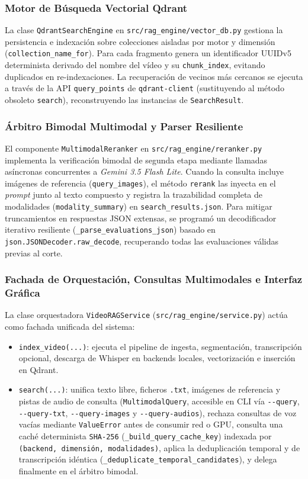 \subsubsection{Motor de Búsqueda Vectorial Qdrant}
La clase \texttt{QdrantSearchEngine} en \texttt{src/rag\_engine/vector\_db.py} gestiona la persistencia e indexación sobre colecciones aisladas por motor y dimensión (\texttt{collection\_name\_for}). Para cada fragmento genera un identificador UUIDv5 determinista derivado del nombre del vídeo y su \texttt{chunk\_index}, evitando duplicados en re-indexaciones. La recuperación de vecinos más cercanos se ejecuta a través de la API \texttt{query\_points} de \texttt{qdrant-client} (sustituyendo al método obsoleto \texttt{search}), reconstruyendo las instancias de \texttt{SearchResult}.

\subsubsection{Árbitro Bimodal Multimodal y Parser Resiliente}
El componente \texttt{MultimodalReranker} en \texttt{src/rag\_engine/reranker.py} implementa la verificación bimodal de segunda etapa mediante llamadas asíncronas concurrentes a \textit{Gemini 3.5 Flash Lite}. Cuando la consulta incluye imágenes de referencia (\texttt{query\_images}), el método \texttt{rerank} las inyecta en el \textit{prompt} junto al texto compuesto y registra la trazabilidad completa de modalidades (\texttt{modality\_summary}) en \texttt{search\_results.json}. Para mitigar truncamientos en respuestas JSON extensas, se programó un decodificador iterativo resiliente (\texttt{\_parse\_evaluations\_json}) basado en \texttt{json.JSONDecoder.raw\_decode}, recuperando todas las evaluaciones válidas previas al corte.

\subsubsection{Fachada de Orquestación, Consultas Multimodales e Interfaz Gráfica}
La clase orquestadora \texttt{VideoRAGService} (\texttt{src/rag\_engine/service.py}) actúa como fachada unificada del sistema:
\begin{itemize}
    \item \texttt{index\_video(...)}: ejecuta el pipeline de ingesta, segmentación, transcripción opcional, descarga de Whisper en backends locales, vectorización e inserción en Qdrant.
    \item \texttt{search(...)}: unifica texto libre, ficheros \texttt{.txt}, imágenes de referencia y pistas de audio de consulta (\texttt{MultimodalQuery}, accesible en CLI vía \texttt{-{}-query}, \texttt{-{}-query-txt}, \texttt{-{}-query-images} y \texttt{-{}-query-audios}), rechaza consultas de voz vacías mediante \texttt{ValueError} antes de consumir red o GPU, consulta una caché determinista \texttt{SHA-256} (\texttt{\_build\_\allowbreak query\_\allowbreak cache\_\allowbreak key}) indexada por \texttt{(backend, dimensión, modalidades)}, aplica la deduplicación temporal y de transcripción idéntica (\texttt{\_deduplicate\_\allowbreak temporal\_\allowbreak candidates}), y delega finalmente en el árbitro bimodal.
\end{itemize}


